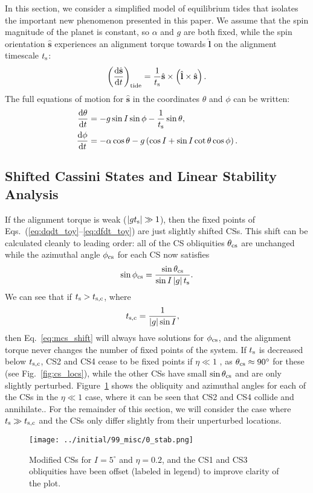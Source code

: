 \documentclass[
        fleqn,
        usenatbib,
    ]{mnras}
\newcommand*{\rd}[2]{\frac{\mathrm{d}#1}{\mathrm{d}#2}}
\newcommand*{\abs}[1]{\left|#1\right|}
\newcommand*{\p}[1]{\left(#1\right)}
\newcommand*{\uv}[1]{\hat{\mathbf{#1}}}
\begin{document}
In this section, we consider a simplified model of equilibrium tides that
isolates the important new phenomenon presented in this paper. We assume that
the spin magnitude of the planet is constant, so $\alpha$ and $g$ are both
fixed, while the spin orientation $\uv{s}$ experiences an alignment torque
towards $\uv{l}$ on the alignment timescale $t_{\rm s}$:
\begin{equation}
    \p{\rd{\uv{s}}{t}}_{\rm tide}
        = \frac{1}{t_{\rm s}} \uv{s} \times \p{\uv{l} \times \uv{s}}.
        \label{eq:dsdt_tide_toy}
\end{equation}
The full equations of motion for $\uv{s}$ in the coordinates $\theta$ and $\phi$
can be written:
\begin{align}
    \rd{\theta}{t} &= -g\sin I \sin \phi - \frac{1}{t_{\rm s}} \sin \theta,
        \label{eq:dqdt_toy}\\
    \rd{\phi}{t} &= -\alpha \cos\theta
        - g\p{\cos I + \sin I \cot \theta \cos \phi}.\label{eq:dfdt_toy}
\end{align}

\subsection{Shifted Cassini States and Linear Stability
Analysis}\label{ss:tidal_equils}

If the alignment torque is weak ($\abs{gt_{\rm s}} \gg 1$), then the fixed points of
Eqs.~(\ref{eq:dqdt_toy}--\ref{eq:dfdt_toy}) are just slightly shifted CSs. This
shift can be calculated cleanly to leading order: all of the CS obliquities
$\theta_{\rm cs}$ are unchanged while the azimuthal angle $\phi_{\rm cs}$ for
each CS now satisfies
\begin{equation}
    \sin \phi_{\rm cs} = \frac{\sin\theta_{\rm cs}}{\sin I \abs{g}t_{\rm s}}.
        \label{eq:mcs_shift}
\end{equation}
We can see that if $t_{\rm s} > t_{\rm s, c}$, where
\begin{align}
    t_{\rm s, c} &= \frac{1}{\abs{g}\sin I},
\end{align}
then Eq.~\eqref{eq:mcs_shift} will always have solutions for $\phi_{\rm cs}$,
and the alignment torque never changes the number of fixed points of the system.
If $t_{\rm s}$ is decreased below $t_{\rm s, c}$, CS2 and CS4 cease to be
fixed points if $\eta \ll 1$ \citep[as first noted in][]{fabrycky_otides}, as
$\theta_{\rm cs} \approx 90^\circ$ for these (see Fig.~\ref{fig:cs_locs}), while
the other CSs have small $\sin \theta_{\rm cs}$ and are only slightly perturbed.
Figure~\ref{fig:mcs} shows the obliquity and azimuthal angles for each of the
CSs in the $\eta \ll 1$ case, where it can be seen that CS2 and CS4 collide and
annihilate.. For the remainder of this section, we will consider the case where
$t_{\rm s} \gg t_{\rm s, c}$ and the CSs only differ slightly from their
unperturbed locations.
\begin{figure}
    \centering
    \texttt{[image: ../initial/99\_misc/0\_stab.png]}
    \caption{Modified CSs for $I = 5^\circ$ and $\eta = 0.2$, and the CS1 and
    CS3 obliquities have been offset (labeled in legend) to improve clarity of
    the plot.}\label{fig:mcs}
\end{figure}
\end{document}
